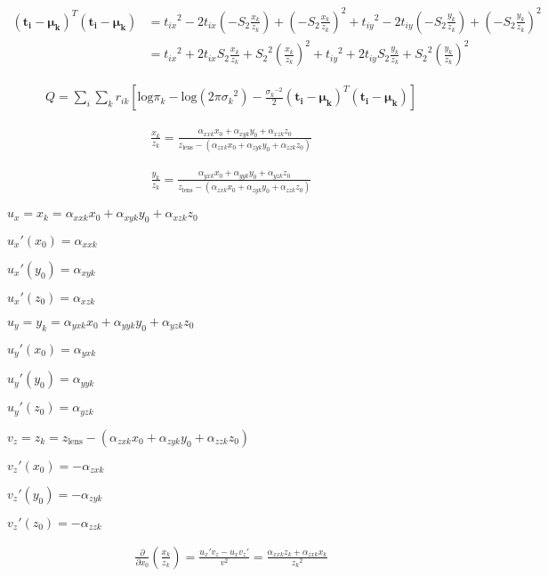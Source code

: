 \begin{align}
(\bm{t_i}-\bm{\mu_k})^T(\bm{t_i}-\bm{\mu_k}) &= {t_{ix}}^2 - 2t_{ix}\left(-S_2\frac{x_k}{z_{k}}\right) + \left(-S_2\frac{x_k}{z_{k}}\right)^2 + {t_{iy}}^2 - 2t_{iy}\left(-S_2\frac{y_k}{z_{k}}\right) + \left(-S_2\frac{y_k}{z_{k}}\right)^2 \\
&= {t_{ix}}^2 + 2t_{ix}S_2\frac{x_k}{z_{k}} + {S_2}^2\left(\frac{x_k}{z_{k}}\right)^2 + {t_{iy}}^2 + 2t_{iy}S_2\frac{y_k}{z_{k}} + {S_2}^2\left(\frac{y_k}{z_{k}}\right)^2
\end{align}


\begin{align}
Q = \sum_i \sum_k r_{ik} \left[ \text{log}\pi_k - \text{log}(2\pi{\sigma_k}^2) - \frac{{\sigma_k}^{-2}}{2}(\bm{t_i}-\bm{\mu_k})^T(\bm{t_i}-\bm{\mu_k}) \right]
\end{align}

\begin{align}
\frac{x_k}{z_k} = \frac{\alpha_{xxk}x_0 + \alpha_{xyk}y_0 + \alpha_{xzk}z_0}{z_\text{lens} - (\alpha_{zxk}x_0 + \alpha_{zyk}y_0 + \alpha_{zzk}z_0)}
\end{align}

\begin{align}
\frac{y_k}{z_k} = \frac{\alpha_{yxk}x_0 + \alpha_{yyk}y_0 + \alpha_{yzk}z_0}{z_\text{lens} - (\alpha_{zxk}x_0 + \alpha_{zyk}y_0 + \alpha_{zzk}z_0)}
\end{align}



$u_x = x_k = \alpha_{xxk}x_0 + \alpha_{xyk}y_0 + \alpha_{xzk}z_0$

${u_x}'(x_0) = \alpha_{xxk}$

${u_x}'(y_0) = \alpha_{xyk}$

${u_x}'(z_0) = \alpha_{xzk}$

$u_y = y_k = \alpha_{yxk}x_0 + \alpha_{yyk}y_0 + \alpha_{yzk}z_0$

${u_y}'(x_0) = \alpha_{yxk}$

${u_y}'(y_0) = \alpha_{yyk}$

${u_y}'(z_0) = \alpha_{yzk}$

$v_z = z_k = z_\text{lens} - (\alpha_{zxk}x_0 + \alpha_{zyk}y_0 + \alpha_{zzk}z_0)$

${v_z}'(x_0) = -\alpha_{zxk}$

${v_z}'(y_0) = -\alpha_{zyk}$

${v_z}'(z_0) = -\alpha_{zzk}$

\begin{align}
\frac{\partial}{\partial x_0}\left(\frac{x_k}{z_k}\right) = \frac{{u_x}'v_z -u_x{v_z}'}{v^2}  = \frac{\alpha_{xxk} z_k + \alpha_{zxk} x_k}{{z_k}^2}
\end{align}

